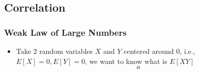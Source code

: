 \subsection{Correlation}
\begin{frame}
\frametitle{Weak Law of Large Numbers}
\logoEvolution\mypagenum
	\begin{itemize}
		\item Take 2 random variables $X$ and $Y$ centered around 0, i.e., $E[X]=0, E[Y]=0$, we want to know what is $E[XY]$
		\begin{equation*}
		a
		\end{equation*}
	\end{itemize}
\end{frame}



